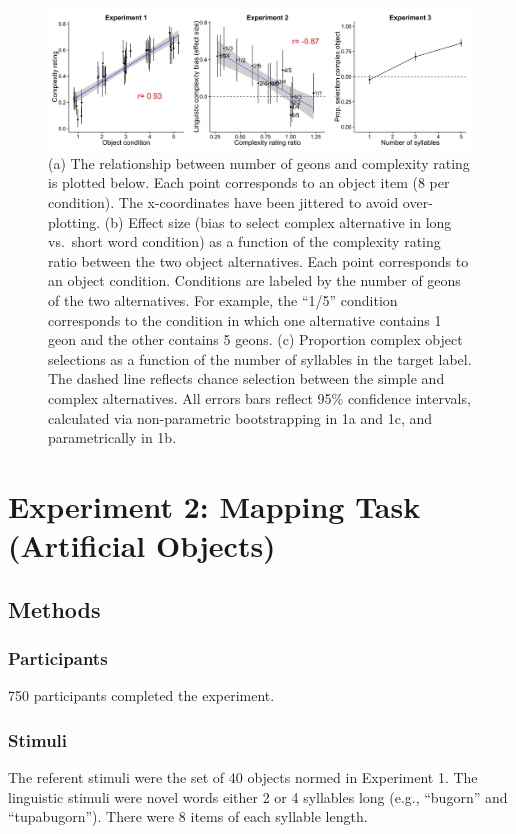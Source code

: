 \documentclass[man]{apa2}
\begin{document}
\begin{figure}[t]
 \begin{center}
  \includegraphics[width=6in]{figures/study1_plots.png}
  \caption{ \label{fig:study1_plots} (a) The relationship between number of geons and complexity rating is plotted below. Each point corresponds to an object item (8 per condition). The x-coordinates have been jittered to avoid over-plotting. (b) Effect size (bias to select complex alternative in long vs.\ short word condition) as a function of the complexity rating ratio between the two object alternatives. Each point corresponds to an object condition. Conditions are labeled by the number of geons of the two alternatives. For example, the ``1/5'' condition corresponds to the condition in which one alternative contains 1 geon and the other contains 5 geons. (c) Proportion complex object selections as a function of the number of syllables in the target label. The dashed line reflects chance selection between the simple and complex alternatives. All errors bars reflect 95\% confidence intervals, calculated via non-parametric bootstrapping in 1a and 1c, and parametrically in 1b.
 }
 \end{center}
\end{figure}


\section{Experiment 2: Mapping Task (Artificial Objects)}


\subsection{Methods}
\subsubsection{Participants} 750 participants completed the experiment.
\subsubsection{Stimuli}
The referent stimuli were the set of 40 objects normed in Experiment 1. The linguistic stimuli were novel words either 2 or 4 syllables long (e.g., ``bugorn'' and ``tupabugorn''). There were 8 items of each syllable length.
\end{document}
